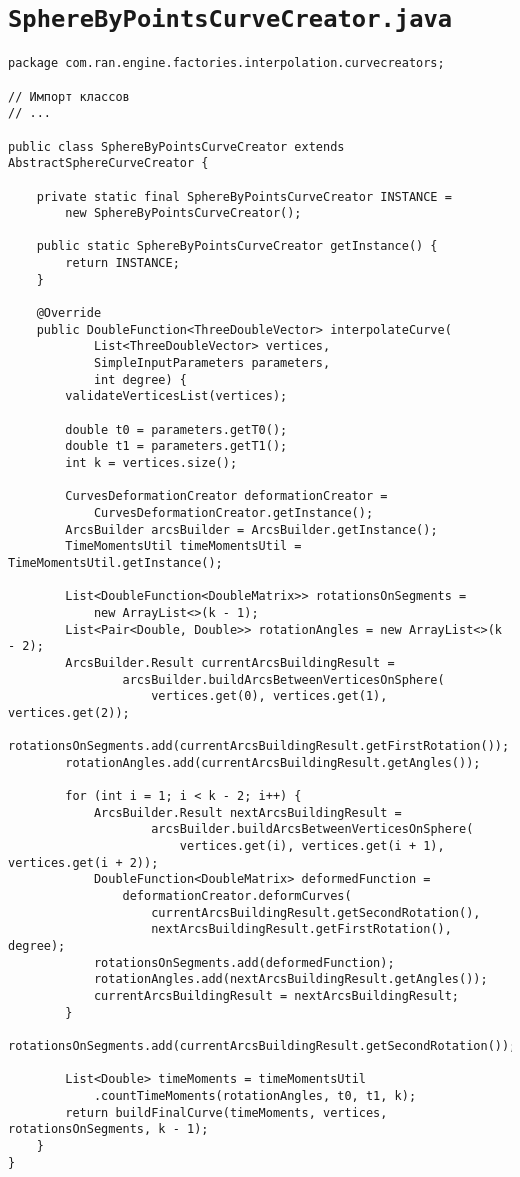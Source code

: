 \section*{\texttt{SphereByPointsCurveCreator.java}}
\begin{verbatim}
package com.ran.engine.factories.interpolation.curvecreators;

// Импорт классов
// ...

public class SphereByPointsCurveCreator extends AbstractSphereCurveCreator {

    private static final SphereByPointsCurveCreator INSTANCE =
        new SphereByPointsCurveCreator();

    public static SphereByPointsCurveCreator getInstance() {
        return INSTANCE;
    }

    @Override
    public DoubleFunction<ThreeDoubleVector> interpolateCurve(
            List<ThreeDoubleVector> vertices,
            SimpleInputParameters parameters,
            int degree) {
        validateVerticesList(vertices);

        double t0 = parameters.getT0();
        double t1 = parameters.getT1();
        int k = vertices.size();

        CurvesDeformationCreator deformationCreator =
            CurvesDeformationCreator.getInstance();
        ArcsBuilder arcsBuilder = ArcsBuilder.getInstance();
        TimeMomentsUtil timeMomentsUtil = TimeMomentsUtil.getInstance();

        List<DoubleFunction<DoubleMatrix>> rotationsOnSegments =
            new ArrayList<>(k - 1);
        List<Pair<Double, Double>> rotationAngles = new ArrayList<>(k - 2);
        ArcsBuilder.Result currentArcsBuildingResult =
                arcsBuilder.buildArcsBetweenVerticesOnSphere(
                    vertices.get(0), vertices.get(1), vertices.get(2));
        rotationsOnSegments.add(currentArcsBuildingResult.getFirstRotation());
        rotationAngles.add(currentArcsBuildingResult.getAngles());

        for (int i = 1; i < k - 2; i++) {
            ArcsBuilder.Result nextArcsBuildingResult =
                    arcsBuilder.buildArcsBetweenVerticesOnSphere(
                        vertices.get(i), vertices.get(i + 1), vertices.get(i + 2));
            DoubleFunction<DoubleMatrix> deformedFunction =
                deformationCreator.deformCurves(
                    currentArcsBuildingResult.getSecondRotation(),
                    nextArcsBuildingResult.getFirstRotation(), degree);
            rotationsOnSegments.add(deformedFunction);
            rotationAngles.add(nextArcsBuildingResult.getAngles());
            currentArcsBuildingResult = nextArcsBuildingResult;
        }
        rotationsOnSegments.add(currentArcsBuildingResult.getSecondRotation());

        List<Double> timeMoments = timeMomentsUtil
            .countTimeMoments(rotationAngles, t0, t1, k);
        return buildFinalCurve(timeMoments, vertices, rotationsOnSegments, k - 1);
    }
}
\end{verbatim}

